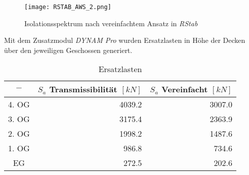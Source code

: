 \begin{figure}[H]
    \centering
    \texttt{[image: RSTAB\_AWS\_2.png]}
    \caption{Isolationsspektrum nach vereinfachtem Ansatz in \emph{RStab}}
\end{figure}

Mit dem Zusatzmodul \emph{DYNAM Pro} wurden Ersatzlasten in Höhe der Decken über den jeweiligen Geschossen generiert.

\begin{table}[H]
\centering
\begin{tabular}{ |c|r|r| } 
 \hline
 $-$ & $S_a$ Transmissibilität $[kN]$ & $S_a$ Vereinfacht $[kN]$\\
 \hline\hline
4. OG & 4039.2 & 3007.0\\
3. OG & 3175.4 & 2363.9\\
2. OG & 1998.2 & 1487.6\\
1. OG &  986.8 &  734.6\\
EG    &  272.5 &  202.6\\
 \hline
\end{tabular}
\caption{Ersatzlasten}
\end{table}

\pagebreak